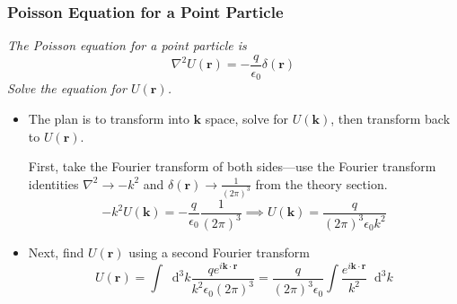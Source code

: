 \documentclass[11pt, a4paper]{article}
\newcommand{\diff}{\mathop{}\!\mathrm{d}} %
\renewcommand{\vec}[1]{\bm{#1}} %
\renewcommand{\r}{\vec{r}}
\begin{document}
\subsubsection{Poisson Equation for a Point Particle}
\textit{The Poisson equation for a point particle is}
\begin{equation*}
	\nabla^{2}U(\r) = - \frac{q}{\epsilon_{0}} \delta (\r)
\end{equation*}
\textit{Solve the equation for $ U(\r) $.}
\begin{itemize}
	
	\item The plan is to transform into $ \vec{k} $ space, solve for $ U(\vec{k}) $, then transform back to $ U(\r) $. 
	
	First, take the Fourier transform of both sides---use the Fourier transform identities $ \nabla^{2} \to -k^{2} $ and $ \delta(\r) \to \frac{1}{(2\pi)^{3}} $ from the theory section.
	\begin{equation*}
		- k^{2}U(\vec{k}) = - \frac{q}{\epsilon_{0}} \frac{1}{(2\pi)^{3}} \implies U(\vec{k}) = \frac{q}{(2\pi)^{3} \epsilon_{0} k^{2}}
	\end{equation*}
	
	\item Next, find $ U(\r) $ using a second Fourier transform
	\begin{equation*}
		U(\r) = \int \diff^{3} k \frac{q e^{i\vec{k}\cdot \r}}{k^{2}\epsilon_{0}(2\pi)^{3}} = \frac{q}{(2\pi)^{3}\epsilon_{0}} \int \frac{e^{i\vec{k}\cdot \r}}{k^{2}} \diff^{3}k
	\end{equation*}
	

\end{itemize}
\end{document}
